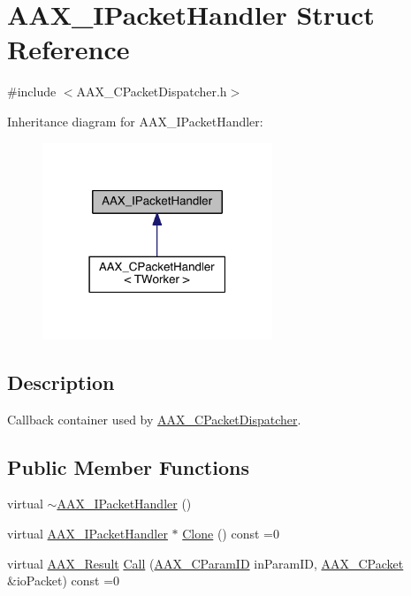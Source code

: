 \hypertarget{a00106}{}\section{A\+A\+X\+\_\+\+I\+Packet\+Handler Struct Reference}
\label{a00106}


{\ttfamily \#include $<$A\+A\+X\+\_\+\+C\+Packet\+Dispatcher.\+h$>$}



Inheritance diagram for A\+A\+X\+\_\+\+I\+Packet\+Handler\+:
\nopagebreak
\begin{figure}[H]
\begin{center}
\leavevmode
\includegraphics[width=195pt]{a00644}
\end{center}
\end{figure}


\subsection{Description}
Callback container used by \hyperlink{a00031}{A\+A\+X\+\_\+\+C\+Packet\+Dispatcher}. \subsection*{Public Member Functions}
\begin{DoxyCompactItemize}
\item 
virtual \hyperlink{a00106_afaf774273572161ec49338cbf7e53a19}{$\sim$\+A\+A\+X\+\_\+\+I\+Packet\+Handler} ()
\item 
virtual \hyperlink{a00106}{A\+A\+X\+\_\+\+I\+Packet\+Handler} $\ast$ \hyperlink{a00106_a1d6270e9a6fb871ca6b83b1275533377}{Clone} () const =0
\item 
virtual \hyperlink{a00149_a4d8f69a697df7f70c3a8e9b8ee130d2f}{A\+A\+X\+\_\+\+Result} \hyperlink{a00106_ab7b07bf6eb7f8f33ee3174ad54716de1}{Call} (\hyperlink{a00149_a1440c756fe5cb158b78193b2fc1780d1}{A\+A\+X\+\_\+\+C\+Param\+I\+D} in\+Param\+I\+D, \hyperlink{a00030}{A\+A\+X\+\_\+\+C\+Packet} \&io\+Packet) const =0
\end{DoxyCompactItemize}


